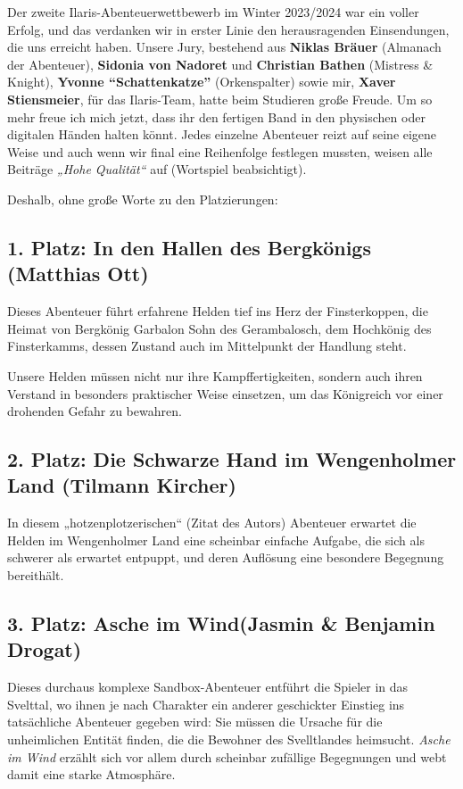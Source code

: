 Der zweite Ilaris-Abenteuerwettbewerb im Winter 2023/2024 war ein voller Erfolg, und das verdanken wir in erster Linie den herausragenden Einsendungen, die uns erreicht haben.
Unsere Jury, bestehend aus \textbf{Niklas Bräuer} (Almanach der Abenteuer), \textbf{Sidonia von Nadoret} und \textbf{Christian Bathen} (Mistress \& Knight), \textbf{Yvonne \enquote{Schattenkatze}} (Orkenspalter) sowie mir, \textbf{Xaver Stiensmeier}, für das Ilaris-Team, hatte beim Studieren große Freude.
Um so mehr freue ich mich jetzt, dass ihr den fertigen Band in den physischen oder digitalen Händen halten könnt. Jedes einzelne Abenteuer reizt auf seine eigene Weise und auch wenn wir final eine Reihenfolge festlegen mussten, weisen alle Beiträge \textit{„Hohe Qualität“} auf (Wortspiel beabsichtigt).

Deshalb, ohne große Worte zu den Platzierungen:

\subsection*{1. Platz: In den Hallen des Bergkönigs (Matthias Ott)}
Dieses Abenteuer führt erfahrene Helden tief ins Herz der Finsterkoppen, die Heimat von Bergkönig Garbalon Sohn des Gerambalosch, dem Hochkönig des Finsterkamms, dessen Zustand auch im Mittelpunkt der Handlung steht.

Unsere Helden müssen nicht nur ihre Kampffertigkeiten, sondern auch ihren Verstand in besonders praktischer Weise einsetzen, um das Königreich vor einer drohenden Gefahr zu bewahren.
\subsection*{2. Platz: Die Schwarze Hand im Wen\-gen\-holmer Land (Tilmann Kircher)}
In diesem „hotzenplotzerischen“ (Zitat des Autors) Abenteuer erwartet die Helden im Wengenholmer Land eine scheinbar einfache Aufgabe, die sich als schwerer als erwartet entpuppt, und deren Auflösung eine besondere Begegnung bereithält.
\subsection*{3. Platz: Asche im Wind\newline (Jasmin \& Benjamin Drogat)}
Dieses durchaus komplexe Sandbox-Abenteuer entführt die Spieler in das Svelttal, wo ihnen je nach Charakter ein anderer geschickter Einstieg ins tatsächliche Abenteuer gegeben wird: Sie müssen die Ursache für die unheimlichen Entität finden, die die Bewohner des Svelltlandes heimsucht. \textit{Asche im Wind} erzählt sich vor allem durch scheinbar zufällige Begegnungen und webt damit eine starke Atmosphäre. 

